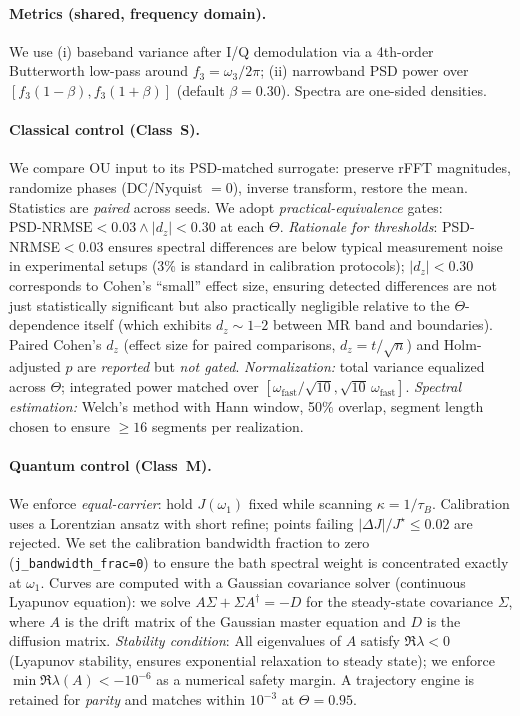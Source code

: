 \documentclass[11pt,letterpaper]{article}
\DeclareRobustCommand{\classS}{\textbf{Class~S}\xspace}
\DeclareRobustCommand{\classM}{\textbf{Class~M}\xspace}
\DeclareRobustCommand{\GatePSD}{\ensuremath{\text{PSD-NRMSE}<0.03}\xspace}
\DeclareRobustCommand{\GateDZ}{\ensuremath{\lvert d_z\rvert<0.30}\xspace}
\DeclareRobustCommand{\GateEQ}{\ensuremath{\GatePSD \wedge \GateDZ}\xspace}
\begin{document}
\paragraph*{Metrics (shared, frequency domain).}
We use (i) baseband variance after I/Q demodulation via a 4th-order Butterworth low-pass around $f_3=\omega_3/2\pi$; (ii) narrowband PSD power over $[f_3(1-\beta),f_3(1+\beta)]$ (default $\beta=0.30$). Spectra are one-sided densities.

\paragraph*{Classical control (\classS).}
We compare OU input to its PSD-matched surrogate: preserve rFFT magnitudes, randomize phases (DC/Nyquist $=0$), inverse transform, restore the mean. Statistics are \emph{paired} across seeds. We adopt \emph{practical-equivalence} gates: \GateEQ{} at each $\Theta$. \emph{Rationale for thresholds}: PSD-NRMSE$<$0.03 ensures spectral differences are below typical measurement noise in experimental setups (3\% is standard in calibration protocols); $|d_z|<$0.30 corresponds to Cohen's ``small'' effect size, ensuring detected differences are not just statistically significant but also practically negligible relative to the $\Theta$-dependence itself (which exhibits $d_z\!\sim\!1$--$2$ between MR band and boundaries). Paired Cohen's $d_z$ (effect size for paired comparisons, $d_z=t/\sqrt{n}$) and Holm-adjusted $p$ are \emph{reported} but \emph{not gated}. \emph{Normalization:} total variance equalized across $\Theta$; integrated power matched over $[\omega_{\mathrm{fast}}/\sqrt{10},\sqrt{10}\,\omega_{\mathrm{fast}}]$. \emph{Spectral estimation:} Welch's method with Hann window, 50\% overlap, segment length chosen to ensure $\ge 16$ segments per realization.

\paragraph*{Quantum control (\classM).}
We enforce \emph{equal-carrier}: hold $J(\omega_1)$ fixed while scanning $\kappa=1/\tau_B$. Calibration uses a Lorentzian ansatz with short refine; points failing $|\Delta J|/J^\star\le 0.02$ are rejected. We set the calibration bandwidth fraction to zero (\texttt{j\_bandwidth\_frac=0}) to ensure the bath spectral weight is concentrated exactly at $\omega_1$. Curves are computed with a Gaussian covariance solver (continuous Lyapunov equation): we solve $A\Sigma + \Sigma A^\dagger = -D$ for the steady-state covariance $\Sigma$, where $A$ is the drift matrix of the Gaussian master equation and $D$ is the diffusion matrix. \emph{Stability condition}: All eigenvalues of $A$ satisfy $\Re\lambda < 0$ (Lyapunov stability, ensures exponential relaxation to steady state); we enforce $\min\Re\lambda(A) < -10^{-6}$ as a numerical safety margin. A trajectory engine is retained for \emph{parity} and matches within $10^{-3}$ at $\Theta=0.95$.
\end{document}
